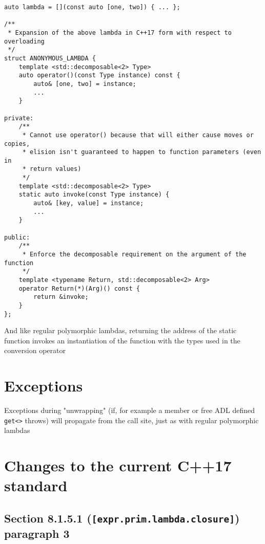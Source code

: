 \documentclass{article}
\begin{document}
\begin{lstlisting}
auto lambda = [](const auto [one, two]) { ... };

/**
 * Expansion of the above lambda in C++17 form with respect to overloading
 */
struct ANONYMOUS_LAMBDA {
    template <std::decomposable<2> Type>
    auto operator()(const Type instance) const {
        auto& [one, two] = instance;
        ...
    }

private:
    /**
     * Cannot use operator() because that will either cause moves or copies,
     * elision isn't guaranteed to happen to function parameters (even in
     * return values)
     */
    template <std::decomposable<2> Type>
    static auto invoke(const Type instance) {
        auto& [key, value] = instance;
        ...
    }

public:
    /**
     * Enforce the decomposable requirement on the argument of the function
     */
    template <typename Return, std::decomposable<2> Arg>
    operator Return(*)(Arg)() const {
        return &invoke;
    }
};
\end{lstlisting}

And like regular polymorphic lambdas, returning the address of the static
function invokes an instantiation of the function with the types used in the
conversion operator

\section{Exceptions}
Exceptions during "unwrapping" (if, for example a member or free ADL defined
\texttt{get<>} throws) will propagate from the call site, just as with regular
polymorphic lambdas


\section{Changes to the current C++17 standard}
\subsection{Section 8.1.5.1 (\texttt{[expr.prim.lambda.closure]}) paragraph 3}
\end{document}
